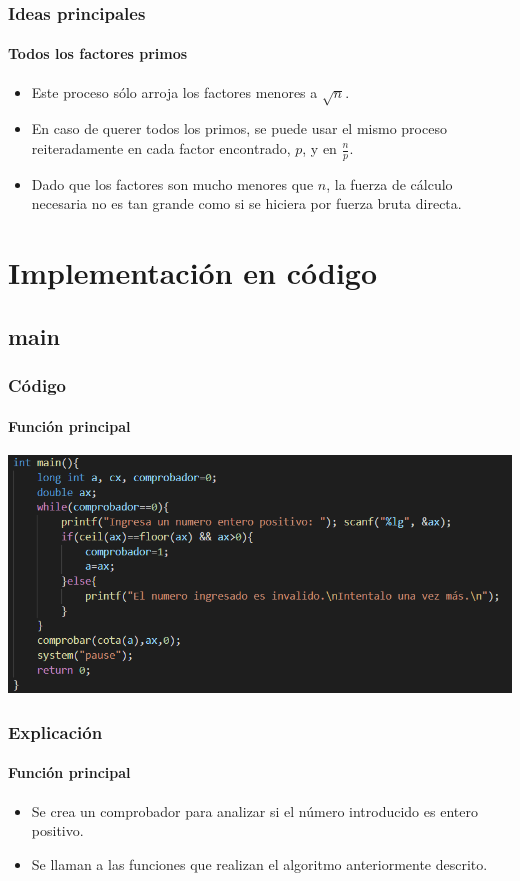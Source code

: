 \documentclass{beamer}
\begin{document}
\begin{frame}
  \frametitle{Ideas principales}
  \framesubtitle{Todos los factores primos}

  \begin{itemize}[<+->] %
  \item Este proceso s\'olo arroja los factores menores a $\sqrt{n}$.
  \item En caso de querer todos los primos, se puede usar el mismo proceso reiteradamente en cada factor encontrado, $p$,  y en $\frac{n}{p}$.
  \item Dado que los factores son mucho menores que $n$, la fuerza de c\'alculo necesaria no es tan grande como si se hiciera por fuerza bruta directa.
  \end{itemize}
\end{frame}

\section{Implementaci\'on en c\'odigo}

\subsection[main]{main}

\begin{frame}
  \frametitle{C\'odigo}
  \framesubtitle{Funci\'on principal}
  \begin{center}
 \includegraphics[scale=0.7]{main}
\end{center}
\end{frame}

\begin{frame}
  \frametitle{Explicaci\'on}
  \framesubtitle{Funci\'on principal}
  \begin{itemize}[<+->] %
  \item Se crea un comprobador para analizar si el n\'umero introducido es entero positivo.
  \item Se llaman a las funciones que realizan el algoritmo anteriormente descrito.
  \end{itemize}
\end{frame}
\end{document}

